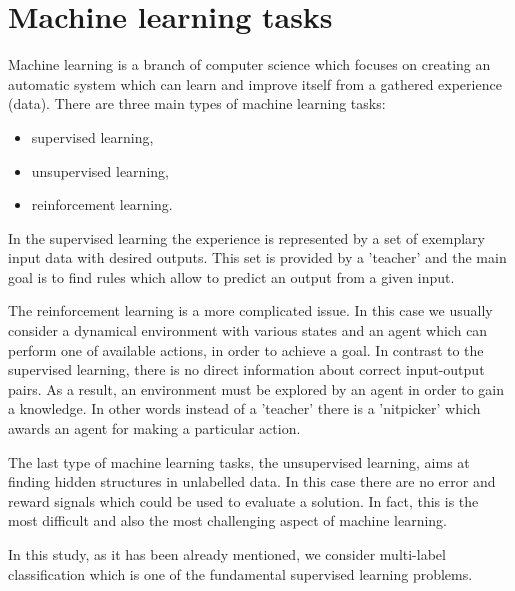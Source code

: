 \section{Machine learning tasks}

Machine learning is a branch of computer science which focuses on creating an automatic system which can learn and improve itself from a gathered experience (data). There are three main types of machine learning tasks:

\begin{itemize}
\item supervised learning,
\item unsupervised learning,
\item reinforcement learning.
\end{itemize}

In the supervised learning the experience is represented by a set of exemplary input data with desired outputs. This set is provided by a 'teacher' and the main goal is to find rules which allow to predict an output from a given input.

The reinforcement learning is a more complicated issue. In this case we usually consider a dynamical environment with various states and an agent which can perform one of available actions, in order to achieve a goal. In contrast to the supervised learning, there is no direct information about correct input-output pairs. As a result, an environment must be explored by an agent in order to gain a knowledge. In other words instead of a 'teacher' there is a 'nitpicker' which awards an agent for making a particular action. 

The last type of machine learning tasks, the unsupervised learning, aims at finding hidden structures in unlabelled data. In this case there are no error and reward signals which could be used to evaluate a solution. In fact, this is the most difficult and also the most challenging aspect of machine learning. 

In this study, as it has been already mentioned, we consider multi-label classification which is one of the fundamental supervised learning problems. 

